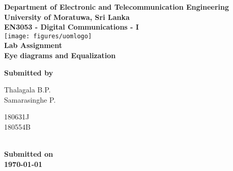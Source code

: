 \begin{titlepage}
\center %

\textbf{\large Department of Electronic and Telecommunication Engineering}\\[0.5cm]
\textbf{\Large University of Moratuwa, Sri Lanka}\\[1cm]
\textbf{\large EN3053 - Digital Communications - I}\\[2cm]
\texttt{[image: figures/uomlogo]}\\[2cm]

	
\textbf{\Huge Lab Assignment}\\[0.5cm]
\textbf{\Large Eye diagrams and Equalization }\\


\vfill %

\textbf{\large Submitted by}\\[0.5cm]
\begin{minipage}{0.2\textwidth}
	\begin{flushleft}
		{\large Thalagala B.P.}\\[4mm]
		{\large Samarasinghe P.}\\[4mm]

		
		
	\end{flushleft}
\end{minipage}
\hspace{5mm}
\begin{minipage}{0.2\textwidth}
	\begin{flushright}
		{\large 180631J }\\[4mm]
		{\large 180554B }\\[4mm]

	\end{flushright}
\end{minipage}\\[1.5cm]


\textbf{\large Submitted on}\\[0.5cm]
\textbf{\Large \today} %




\end{titlepage}